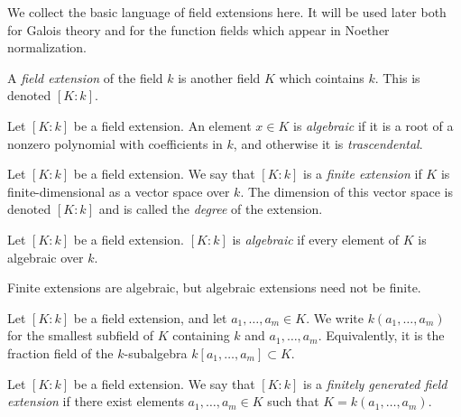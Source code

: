 \noindent
We collect the basic language of field
extensions here. It will be used later both
for Galois theory and for the function fields
which appear in Noether normalization.

\begin{definition}
\label{definition-field-extension}
A {\it field extension}
of the field $k$ is another field $K$ which
cointains $k$.
This is denoted $[K:k]$.
\end{definition}

\begin{definition}
\label{definition-algebraic-element}
Let $[K:k]$ be a field extension.
An element $x \in K$ is {\it algebraic} if it
is a root
of a nonzero polynomial with coefficients in
$k$,
and otherwise it is {\it trascendental}.
\end{definition}

\begin{definition}
\label{definition-finite-extension}
Let $[K:k]$ be a field extension.
We say that $[K:k]$ is a {\it finite
extension}
if $K$ is finite-dimensional as a vector
space
over $k$.
The dimension of this vector space is denoted
$[K:k]$ and is called the {\it degree} of the
extension.
\end{definition}

\begin{definition}
\label{definition-algebraic-extension}
Let $[K:k]$ be a field extension.
$[K:k]$ is {\it algebraic} if every element
of $K$ is algebraic over $k$.
\end{definition}

\noindent
Finite extensions are algebraic, but
algebraic extensions need not be finite.

\begin{definition}
\label{definition-field-generated-by-%
elements}
Let $[K:k]$ be a field extension, and let
$a_1,\ldots,a_m \in K$.
We write $k(a_1,\ldots,a_m)$ for the smallest
subfield of $K$ containing $k$ and
$a_1,\ldots,a_m$.
Equivalently, it is the fraction field of the
$k$-subalgebra $k[a_1,\ldots,a_m]\subset K$.
\end{definition}

\begin{definition}
\label{definition-finitely-generated-field-%
extension}
Let $[K:k]$ be a field extension.
We say that $[K:k]$ is a {\it finitely
generated field extension} if there exist
elements $a_1,\ldots,a_m \in K$ such that
$K=k(a_1,\ldots,a_m)$.
\end{definition}

